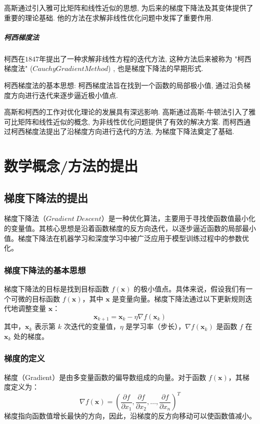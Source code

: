 \documentclass[printMode=true, declarePage=false]{ecnuthesis}
\begin{document}
    高斯通过引入雅可比矩阵和线性近似的思想, 为后来的梯度下降法及其变体提供了重要的理论基础.
    他的方法在求解非线性优化问题中发挥了重要作用.

    \paragraph{柯西梯度法}

    柯西在$1847$年提出了一种求解非线性方程的迭代方法, 这种方法后来被称为 "柯西梯度法"  ($Cauchy Gradient
    Method$) , 也是梯度下降法的早期形式.

    柯西梯度法的基本思想:
    柯西梯度法旨在找到一个函数的局部极小值, 通过沿负梯度方向进行迭代来逐步逼近极小值点.

    高斯和柯西的工作对优化理论的发展具有深远影响.
    高斯通过高斯-牛顿法引入了雅可比矩阵和线性近似的概念,
    为非线性优化问题提供了有效的解决方案.
    而柯西通过柯西梯度法提出了沿梯度方向进行迭代的方法,
    为梯度下降法奠定了基础.


    \chapter{数学概念/方法的提出}

    \section{梯度下降法的提出}

    梯度下降法（$Gradient\ Descent$）是一种优化算法，主要用于寻找使函数值最小化的变量值。其核心思想是沿着函数梯度的反方向迭代，以逐步逼近函数的局部最小值。梯度下降法在机器学习和深度学习中被广泛应用于模型训练过程中的参数优化。

    \subsection{梯度下降法的基本思想}
    梯度下降法的目标是找到目标函数 \( f(\mathbf{x}) \) 的极小值点。具体来说，假设我们有一个可微的目标函数 \( f(\mathbf{x}) \)，其中 \( \mathbf{x} \) 是变量向量。梯度下降法通过以下更新规则迭代地调整变量 \( \mathbf{x} \)：
    \[
        \mathbf{x}_{k+1} = \mathbf{x}_k - \eta \nabla f(\mathbf{x}_k)
    \]
    其中，\( \mathbf{x}_k \) 表示第 \( k \) 次迭代的变量值，\( \eta \) 是学习率（步长），\( \nabla f(\mathbf{x}_k) \) 是函数 \( f \) 在 \( \mathbf{x}_k \) 处的梯度。

    \subsection{梯度的定义}
    梯度（Gradient）是由多变量函数的偏导数组成的向量。对于函数 \( f(\mathbf{x}) \)，其梯度定义为：
    \[
        \nabla f(\mathbf{x}) = \left( \frac{\partial f}{\partial x_1}, \frac{\partial f}{\partial x_2}, \ldots, \frac{\partial f}{\partial x_n} \right)^T
    \]
    梯度指向函数值增长最快的方向，因此，沿梯度的反方向移动可以使函数值减小。
\end{document}
